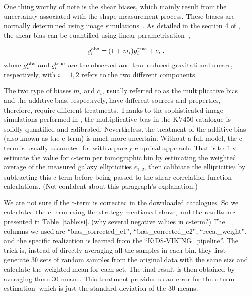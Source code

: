 \documentclass[fleqn,usenatbib]{mnras}
\newcommand{\R}{\color{red}}
\begin{document}
\newpage

One thing worthy of note is the shear biases, which mainly result from the uncertainty associated with the shape measurement process. These biases are normally determined using image simulations~\citep{ImSim_2017MNRAS.467.1627F,ImSim_2019A&A...624A..92K}. As detailed in the section 4 of \citet{2018arXiv181206076H}, the shear bias can be quantified using linear parametrisation~\citep{shearbias_2006MNRAS.368.1323H,shearbias_2007MNRAS.376...13M},

\begin{equation}
\label{equ:shearbias}
g^{\rm obs}_i = (1+m_i)g^{\rm true}_i + c_i~,
\end{equation}
where $g^{\rm obs}_i$ and $g^{\rm true}_i$ are the observed and true reduced gravitational shears, respectively, with $i=1,2$ refers to the two different components.

The two type of biases $m_i$ and $c_i$, usually referred to as the multiplicative bias and the additive bias, respectively, have different sources and properties, therefore, require different treatments. Thanks to the sophisticated image simulations performed in \citet{ImSim_2019A&A...624A..92K}, the multiplicative bias in the KV450 catalogue is solidly quantified and calibrated. Nevertheless, the treatment of the additive bias (also known as the c-term) is much more uncertain. Without a full model, the c-term is usually accounted for with a purely emprical approach. That is to first estimate the value for c-term per tomographic bin by estimating the weighted average of the measured galaxy ellipticities $\epsilon_{1,2}$, then calibrate the ellipticities by subtracting this c-term before being passed to the shear correlation function calculations. ({\R Not confident about this paragraph's explanation.})

We are not sure if the c-term is corrected in the downloaded catalogues. So we calculated the c-term using the strategy mentioned above, and the results are presented in Table~\ref{table:si}. ({\R why several negative values in c-term?}) The columns we used are ``bias\_corrected\_e1'', ``bias\_corrected\_e2'', ``recal\_weight'', and the specific realization is learned from the ``KiDS-VIKING\_pipeline''. The trick is, instead of directly averaging all the samples in each bin, they first generate 30 sets of random samples from the original data with the same size and calculate the weighted mean for each set. The final result is then obtained by averaging these 30 means. This treatment provides us an error for the c-term estimation, which is just the standard deviation of the 30 means. 
\end{document}
